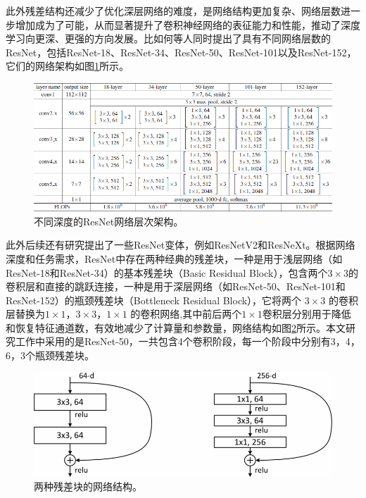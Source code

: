 \documentclass[lang=chs, degree=master, blindreview=false, adobe=false]{yanputhesis}
\begin{document}
此外残差结构还减少了优化深层网络的难度，是网络结构更加复杂、网络层数进一步增加成为了可能，从而显著提升了卷积神经网络的表征能力和性能，推动了深度学习向更深、更强的方向发展。比如何等人同时提出了具有不同网络层数的ResNet，包括ResNet-18、ResNet-34、ResNet-50、ResNet-101以及ResNet-152，它们的网络架构如图\ref{fig:resnet}所示。
\begin{figure}[htb]
  \centering
  \includegraphics[scale=0.55]{images/resnet.png}
  \caption{
    不同深度的ResNet网络层次架构\cite{He2015ResNet}。
  }
  \label{fig:resnet}
\end{figure}
此外后续还有研究提出了一些ResNet变体，例如ResNetV2\cite{2019resnetV2}和ResNeXt\cite{xie2017ResNeXt}。根据网络深度和任务需求，ResNet中存在两种经典的残差块，一种是用于浅层网络（如ResNet-18和ResNet-34）的基本残差块（Basic Residual Block），包含两个$ 3\times3 $的卷积层和直接的跳跃连接，一种是用于深层网络（如ResNet-50、ResNet-101和ResNet-152）的瓶颈残差块（Bottleneck Residual Block），它将两个 $ 3\times3 $ 的卷积层替换为$1 \times 1$，$3 \times 3$，$1 \times 1$ 的卷积网络,其中前后两个$1 \times 1$卷积层分别用于降低和恢复特征通道数，有效地减少了计算量和参数量，网络结构如图\ref{fig:resblock}所示。本文研究工作中采用的是ResNet-50，一共包含4个卷积阶段，每一个阶段中分别有3，4，6，3个瓶颈残差块。


\begin{figure}[htb]
  \centering
  \includegraphics[scale=0.55]{images/res-block.png}
  \caption{
    两种残差块的网络结构\cite{He2015ResNet}。
  }
  \label{fig:resblock}
\end{figure}
\end{document}
